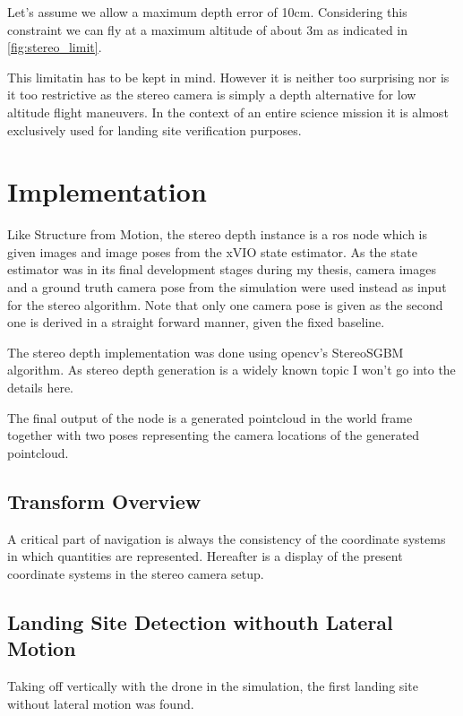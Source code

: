 Let's assume we allow a maximum depth error of 10cm. Considering this constraint we can fly at a maximum altitude of about 3m as indicated in \cref{fig:stereo_limit}.

This limitatin has to be kept in mind. However it is neither too surprising nor is it too restrictive as the stereo camera is simply a depth alternative for low altitude flight maneuvers. In the context of an entire science mission it is almost exclusively used for landing site verification purposes.

\section{Implementation}

Like Structure from Motion, the stereo depth instance is a ros node which is given images and image poses from the xVIO state estimator. As the state estimator was in its final development stages during my thesis, camera images and a ground truth camera pose from the simulation were used instead as input for the stereo algorithm. Note that only one camera pose is given as the second one is derived in a straight forward manner, given the fixed baseline.

The stereo depth implementation was done using opencv's StereoSGBM algorithm. As stereo depth generation is a widely known topic I won't go into the details here.

The final output of the node is a generated pointcloud in the world frame together with two poses representing the camera locations of the generated pointcloud.

\subsection{Transform Overview}

A critical part of navigation is always the consistency of the coordinate systems in which quantities are represented. Hereafter is a display of the present coordinate systems in the stereo camera setup.

\subsection{Landing Site Detection withouth Lateral Motion}

Taking off vertically with the drone in the simulation, the first landing site without lateral motion was found.

